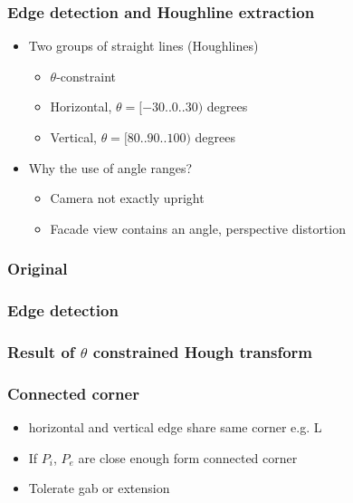 \documentclass{beamer}
\begin{document}
\frame
{
	\frametitle{Edge detection and Houghline extraction}
	\begin{itemize}
	\item <+-| alert@+> Two groups of straight lines (Houghlines)
	\begin{itemize}
		\item $\theta$-constraint
		\item <+-| alert@+> Horizontal, $\theta = [-30..0..30)$ degrees
		\item <+-| alert@+> Vertical, $\theta = [80..90..100)$ degrees
	\end{itemize}
	\item <+-| alert@+> Why the use of angle ranges?
	\begin{itemize}
		\item <+-| alert@+> Camera not exactly upright
		\item <+-| alert@+> Facade view contains an angle, perspective distortion 
	\end{itemize}
	\end{itemize}

}

\frame
{
	\frametitle{Original}
}

\frame
{
	\frametitle{Edge detection}
}

\frame
{
	\frametitle{Result of $\theta$ constrained Hough transform}
}

\frame
{
	\frametitle{Connected corner}
	\begin{itemize}
	\item <+-| alert@+> horizontal and vertical edge share same corner e.g. L
	\item <+-| alert@+> If $P_i$, $P_e$ are close enough form connected corner
	\item <+-| alert@+> Tolerate gab or extension
	\end{itemize}
}
\end{document}
